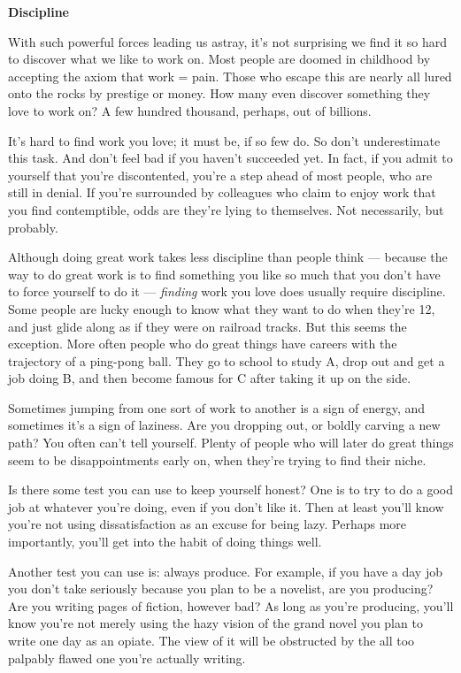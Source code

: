 \textbf{Discipline}

With such powerful forces leading us astray, it's not surprising we find
it so hard to discover what we like to work on. Most people are doomed
in childhood by accepting the axiom that work = pain. Those who escape
this are nearly all lured onto the rocks by prestige or money. How many
even discover something they love to work on? A few hundred thousand,
perhaps, out of billions.

It's hard to find work you love; it must be, if so few do. So don't
underestimate this task. And don't feel bad if you haven't succeeded
yet. In fact, if you admit to yourself that you're discontented, you're
a step ahead of most people, who are still in denial. If you're
surrounded by colleagues who claim to enjoy work that you find
contemptible, odds are they're lying to themselves. Not necessarily, but
probably.

Although doing great work takes less discipline than people think ---
because the way to do great work is to find something you like so much
that you don't have to force yourself to do it --- \emph{finding} work
you love does usually require discipline. Some people are lucky enough
to know what they want to do when they're 12, and just glide along as if
they were on railroad tracks. But this seems the exception. More often
people who do great things have careers with the trajectory of a
ping-pong ball. They go to school to study A, drop out and get a job
doing B, and then become famous for C after taking it up on the side.

Sometimes jumping from one sort of work to another is a sign of energy,
and sometimes it's a sign of laziness. Are you dropping out, or boldly
carving a new path? You often can't tell yourself. Plenty of people who
will later do great things seem to be disappointments early on, when
they're trying to find their niche.

Is there some test you can use to keep yourself honest? One is to try to
do a good job at whatever you're doing, even if you don't like it. Then
at least you'll know you're not using dissatisfaction as an excuse for
being lazy. Perhaps more importantly, you'll get into the habit of doing
things well.

Another test you can use is: always produce. For example, if you have a
day job you don't take seriously because you plan to be a novelist, are
you producing? Are you writing pages of fiction, however bad? As long as
you're producing, you'll know you're not merely using the hazy vision of
the grand novel you plan to write one day as an opiate. The view of it
will be obstructed by the all too palpably flawed one you're actually
writing.

